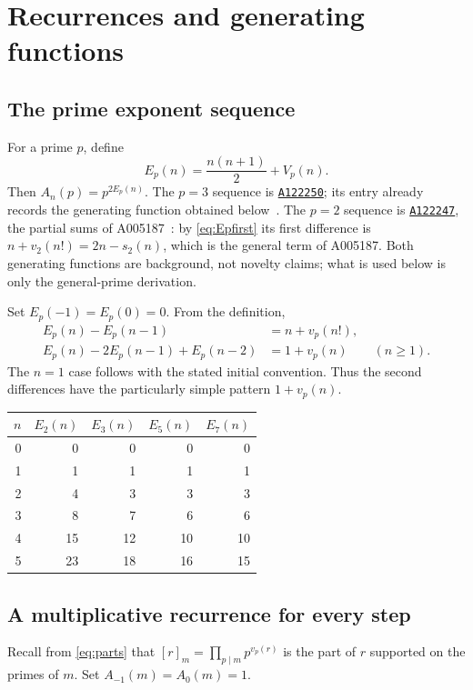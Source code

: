 \documentclass[11pt,a4paper]{article}
\numberwithin{equation}{section}
\theoremstyle{definition}
\theoremstyle{remark}
\newcommand{\OEIS}[1]{\href{https://oeis.org/#1}{\texttt{#1}}}
\begin{document}
\section{Recurrences and generating functions}\label{sec:sequences}

\subsection{The prime exponent sequence}
For a prime $p$, define
\begin{equation}\label{eq:Ep}
 E_p(n)=\frac{n(n+1)}2+V_p(n).
\end{equation}
Then $A_n(p)=p^{2E_p(n)}$. The $p=3$ sequence is \OEIS{A122250}; its entry already records the generating function obtained below~\cite{oeis250}. The $p=2$ sequence is \OEIS{A122247}, the partial sums of A005187~\cite{oeis247}: by \eqref{eq:Epfirst} its first difference is $n+v_2(n!)=2n-s_2(n)$, which is the general term of A005187. Both generating functions are background, not novelty claims; what is used below is only the general-prime derivation.

Set $E_p(-1)=E_p(0)=0$. From the definition,
\begin{align}
 E_p(n)-E_p(n-1)&=n+v_p(n!),\label{eq:Epfirst}\\
 E_p(n)-2E_p(n-1)+E_p(n-2)&=1+v_p(n)\qquad(n\geq1).\label{eq:Epsecond}
\end{align}
The $n=1$ case follows with the stated initial convention. Thus the second differences have the particularly simple pattern $1+v_p(n)$.

\begin{center}
\begin{tabular}{r r r r r}
\toprule
$n$ & $E_2(n)$ & $E_3(n)$ & $E_5(n)$ & $E_7(n)$\\
\midrule
0&0&0&0&0\\
1&1&1&1&1\\
2&4&3&3&3\\
3&8&7&6&6\\
4&15&12&10&10\\
5&23&18&16&15\\
\bottomrule
\end{tabular}
\end{center}

\subsection{A multiplicative recurrence for every step}
Recall from \eqref{eq:parts} that $[r]_m=\prod_{p\mid m}p^{v_p(r)}$ is the part of $r$ supported on the primes of $m$. Set $A_{-1}(m)=A_0(m)=1$.
\end{document}

